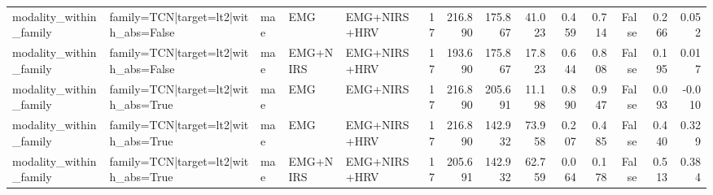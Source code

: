 \begin{table}
\begin{tabular}{lllllrrrrrrrrr}
modality_within_family & family=TCN|target=lt2|with_abs=False & mae & EMG & EMG+NIRS+HRV & 17 & 216.890 & 175.867 & 41.023 & 0.459 & 0.714 & False & 0.266 & 0.052 \\
modality_within_family & family=TCN|target=lt2|with_abs=False & mae & EMG+NIRS & EMG+NIRS+HRV & 17 & 193.690 & 175.867 & 17.823 & 0.644 & 0.808 & False & 0.195 & 0.017 \\
modality_within_family & family=TCN|target=lt2|with_abs=True & mae & EMG & EMG+NIRS & 17 & 216.890 & 205.691 & 11.198 & 0.890 & 0.947 & False & 0.093 & -0.010 \\
modality_within_family & family=TCN|target=lt2|with_abs=True & mae & EMG & EMG+NIRS+HRV & 17 & 216.890 & 142.932 & 73.958 & 0.207 & 0.485 & False & 0.440 & 0.329 \\
modality_within_family & family=TCN|target=lt2|with_abs=True & mae & EMG+NIRS & EMG+NIRS+HRV & 17 & 205.691 & 142.932 & 62.759 & 0.064 & 0.178 & False & 0.513 & 0.384 \\
\bottomrule
\end{tabular}
\end{table}
